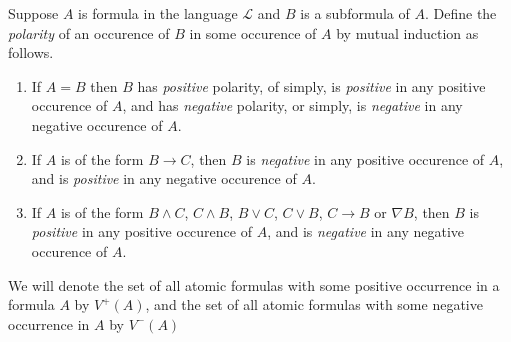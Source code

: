 \begin{dfn}\label{dfn:polarity}
  Suppose $A$ is formula in the language $\mathcal{L}$ and $B$ is a subformula of $A$. Define the \emph{polarity} of an occurence of $B$ in some occurence of $A$ by mutual induction as follows.
  \begin{enumerate}
    \item If $A = B$ then $B$ has \emph{positive} polarity, of simply, is \emph{positive} in any positive occurence of $A$, and has \emph{negative} polarity, or simply, is \emph{negative} in any negative occurence of $A$.
    \item If $A$ is of the form $B \rightarrow C$, then $B$ is \emph{negative} in any positive occurence of $A$, and is \emph{positive} in any negative occurence of $A$.
    \item If $A$ is of the form $B \wedge C$, $C \wedge B$, $B \vee C$, $C \vee B$, $C \rightarrow B$ or $\nabla B$, then $B$ is \emph{positive} in any positive occurence of $A$, and is \emph{negative} in any negative occurence of $A$.
  \end{enumerate}

  We will denote the set of all atomic formulas with some positive occurrence in a formula $A$ by $V^+(A)$, and the set of all atomic formulas with some negative occurrence in $A$ by $V^-(A)$
\end{dfn}